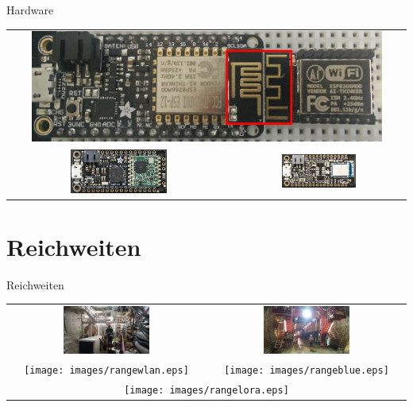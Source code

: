 \documentclass[18pt]{beamer}
\begin{document}
\begin{frame}{Hardware}
	\begin{tabular}{cc}
		\multicolumn{2}{c}{\includegraphics[width=0.9\textwidth]{images/espmodules.png}}\\
		\includegraphics[width=0.45\textwidth]{images/loraada.png} & \includegraphics[width=0.45\textwidth]{images/nrf52ada.png}\\
	\end{tabular}
\end{frame}

\section{Reichweiten}
\begin{frame}{Reichweiten}
	\begin{tabular}{cc}
		\includegraphics[width=0.45\textwidth]{images/tunnel.jpg} & \includegraphics[width=0.45\textwidth]{images/schalungswagen.jpg}\\
		\texttt{[image: images/rangewlan.eps]} & \texttt{[image: images/rangeblue.eps]} \\
		\multicolumn{2}{c}{\texttt{[image: images/rangelora.eps]}}\\
	\end{tabular}
\end{frame}
\end{document}
